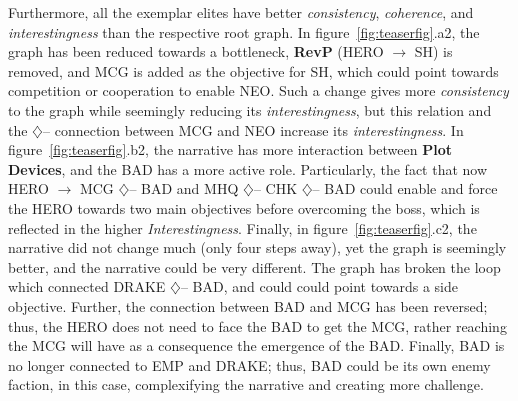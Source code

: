 

Furthermore, all the exemplar elites have better \textit{consistency}, \textit{coherence}, and \textit{interestingness} than the respective root graph. In figure~\ref{fig:teaserfig}.a2, the graph has been reduced towards a bottleneck, \textbf{RevP} (HERO $\rightarrow$ SH) is removed, and MCG is added as the objective for SH, which could point towards competition or cooperation to enable NEO. Such a change gives more \textit{consistency} to the graph while seemingly reducing its \textit{interestingness}, but this relation and the $\diamondsuit$-- connection between MCG and NEO increase its \textit{interestingness}. In figure~\ref{fig:teaserfig}.b2, the narrative has more interaction between \textbf{Plot Devices}, and the BAD has a more active role. Particularly, the fact that now HERO $\rightarrow$ MCG $\diamondsuit$-- BAD and MHQ $\diamondsuit$-- CHK $\diamondsuit$-- BAD could enable and force the HERO towards two main objectives before overcoming the boss, which is reflected in the higher \textit{Interestingness}. Finally, in figure~\ref{fig:teaserfig}.c2, the narrative did not change much (only four steps away), yet the graph is seemingly better, and the narrative could be very different. The graph has broken the loop which connected DRAKE $\diamondsuit$-- BAD, and could could point towards a side objective. Further, the connection between BAD and MCG has been reversed; thus, the HERO does not need to face the BAD to get the MCG, rather reaching the MCG will have as a consequence the emergence of the BAD. Finally, BAD is no longer connected to EMP and DRAKE; thus, BAD could be its own enemy faction, in this case, complexifying the narrative and creating more challenge.